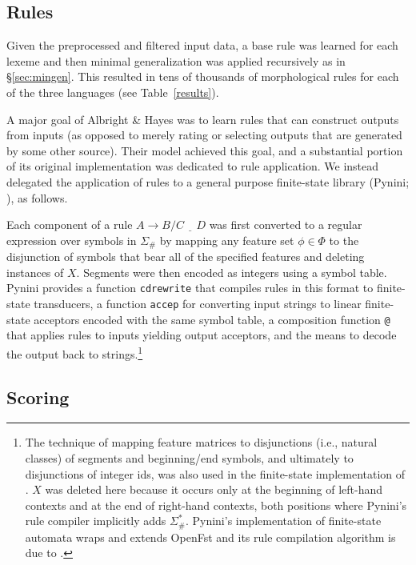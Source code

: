 \documentclass[11pt]{article}
\begin{document}
\subsection{Rules}

Given the preprocessed and filtered input data, a base rule was learned for each lexeme and then minimal generalization was applied recursively as in \S\ref{sec:mingen}. This resulted in tens of thousands of morphological rules for each of the three languages (see Table~\ref{results}).

A major goal of Albright \& Hayes was to learn rules that can construct outputs from inputs (as opposed to merely rating or selecting outputs that are generated by some other source). Their model achieved this goal, and a substantial portion of its original implementation was dedicated to rule application. We instead delegated the application of rules to a general purpose finite-state library (Pynini; \citealp{gorman-2016-pynini, gorman2021}), as follows.

Each component of a rule $A \to B / C \ \underline{\ \ \ } \ D$ was first converted to a regular expression over symbols in $\Sigma_{\#}$ by mapping any feature set $\phi \in \Phi$ to the disjunction of symbols that bear all of the specified features and deleting instances of $X$. Segments were then encoded as integers using a symbol table. Pynini provides a function \texttt{cdrewrite} that compiles rules in this format to finite-state transducers, a function \texttt{accep} for converting input strings to linear finite-state acceptors encoded with the same symbol table, a composition function \texttt{@} that applies rules to inputs yielding output acceptors, and the means to decode the output back to strings.\footnote{The technique of mapping feature matrices to disjunctions (i.e., natural classes) of segments and beginning/end symbols, and ultimately to disjunctions of integer ids, was also used in the finite-state implementation of \citet{hayes2008}. $X$ was deleted here because it occurs only at the beginning of left-hand contexts and at the end of right-hand contexts, both positions where Pynini's rule compiler implicitly adds $\Sigma_{\#}^*$. Pynini's implementation of finite-state automata wraps and extends OpenFst \citep{riley-etal-2009-openfst} and its rule compilation algorithm is due to \citet{mohri-sproat-1996-efficient}.}

\subsection{Scoring}
\end{document}
